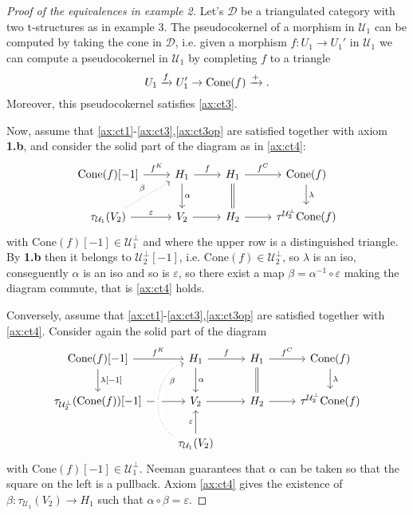 \begin{proof}[Proof of the equivalences in example 2]
  Let's $\mathcal{D}$ be a triangulated category with two t-structures as in example 3. The pseudocokernel
  of a morphism in $\mathcal{U}_1$ can be computed by taking the cone in $\mathcal{D}$, i.e. given a morphism
  $f:U_1\to U_1'$ in $\mathcal{U}_1$ we can compute a pseudocokernel in $\mathcal{U}_1$ by completing $f$
  to a triangle
  \begin{equation*}
    U_1\xrightarrow{f}U_1'\to \mathrm{Cone}(f)\xrightarrow{+}.
  \end{equation*}
  Moreover, this pseudocokernel satisfies \ref{ax:ct3}.

  Now, assume that \ref{ax:ct1}-\ref{ax:ct3},\ref{ax:ct3op} are satisfied together with axiom
  \textbf{1.b}, and consider the solid part of the diagram as in \ref{ax:ct4}:
  \begin{equation*}
    \begin{tikzcd}
      \mathrm{Cone}(f)[-1]\arrow{r}{f^K}
        & H_1\arrow{r}{f}\arrow{d}{\alpha}
          & H_1\arrow{r}{f^C}\arrow[equal]{d}
            & \mathrm{Cone}(f)\arrow{d}{\lambda}\\
      \tau_{\mathcal{U}_1}(V_2)\arrow{r}{\varepsilon}\arrow[dotted]{ur}{\beta}
        & V_2\arrow{r}
          & H_2\arrow{r}
            & \tau^{\mathcal{U}_2^\perp}\mathrm{Cone}(f)
    \end{tikzcd}
  \end{equation*}
  with $\mathrm{Cone}(f)[-1]\in\mathcal{U}_1^\perp$ and where the upper row is a
  distinguished triangle. By \textbf{1.b} then it belongs
  to $\mathcal{U}_2^\perp[-1]$, i.e. $\mathrm{Cone}(f)\in\mathcal{U}_2^\perp$, so
  $\lambda$ is an iso, conseguently $\alpha$ is an iso and so is $\varepsilon$, so
  there exist a map $\beta=\alpha^{-1}\circ\varepsilon$ making the diagram commute, that
  is \ref{ax:ct4} holds.

  Conversely, assume that \ref{ax:ct1}-\ref{ax:ct3},\ref{ax:ct3op} are satisfied together with
  \ref{ax:ct4}. Consider again the solid part of the diagram
  \begin{equation*}
    \begin{tikzcd}
      \mathrm{Cone}(f)[-1]\arrow{r}{f^K}\arrow{d}{\lambda[-1]}
        & H_1\arrow{r}{f}\arrow{d}{\alpha}
          & H_1\arrow{r}{f^C}\arrow[equal]{d}
            & \mathrm{Cone}(f)\arrow{d}{\lambda}\\
      \tau_{\mathcal{U}_2^\perp}(\mathrm{Cone}(f))[-1]\arrow{r}
        & V_2\arrow{r}
          & H_2\arrow{r}
            & \tau^{\mathcal{U}_2^\perp}\mathrm{Cone}(f)\\
        & \tau_{\mathcal{U}_1}(V_2)\arrow{u}{\varepsilon}\arrow[dotted, crossing over, bend left=70]{uu}[near end,']{\beta}
        & &
    \end{tikzcd}
  \end{equation*}
  with $\mathrm{Cone}(f)[-1]\in\mathcal{U}_1^\perp$. Neeman  guarantees
  that $\alpha$ can be taken so that the square on the left is a pullback. Axiom \ref{ax:ct4}
  gives the existence of $\beta:\tau_{\mathcal{U}_1}(V_2)\to H_1$ such that $\alpha\circ\beta=\varepsilon$.


\end{proof}

